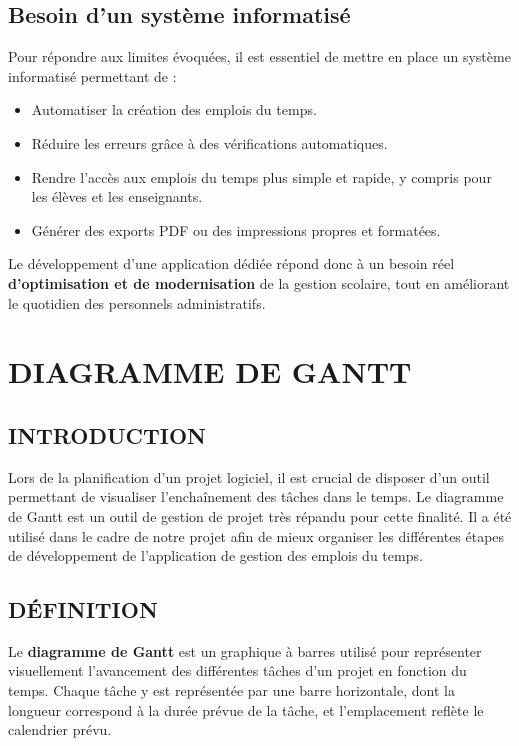 \documentclass[english,12pt,a4paper]{report}
\begin{document}
\section{Besoin d’un système informatisé}
Pour répondre aux limites évoquées, il est essentiel de mettre en place un système informatisé permettant de :
\begin{itemize}
	\item Automatiser la création des emplois du temps.
	\item Réduire les erreurs grâce à des vérifications automatiques.
	\item Rendre l’accès aux emplois du temps plus simple et rapide, y compris pour les élèves et les enseignants.
	\item Générer des exports PDF ou des impressions propres et formatées.
\end{itemize}
Le développement d’une application dédiée répond donc à un besoin réel \textbf{d’optimisation et de modernisation} de la gestion scolaire, tout en améliorant le quotidien des personnels administratifs.

\chapter{DIAGRAMME DE GANTT}
\section{INTRODUCTION}
Lors de la planification d’un projet logiciel, il est crucial de disposer d’un outil permettant de visualiser l’enchaînement des tâches dans le temps. Le diagramme de Gantt est un outil de gestion de projet très répandu pour cette finalité. Il a été utilisé dans le cadre de notre projet afin de mieux organiser les différentes étapes de développement de l'application de gestion des emplois du temps.
\section{DÉFINITION}
Le \textbf{diagramme de Gantt} est un graphique à barres utilisé pour représenter visuellement l’avancement des différentes tâches d’un projet en fonction du temps. Chaque tâche y est représentée par une barre horizontale, dont la longueur correspond à la durée prévue de la tâche, et l’emplacement reflète le calendrier prévu.
\end{document}
